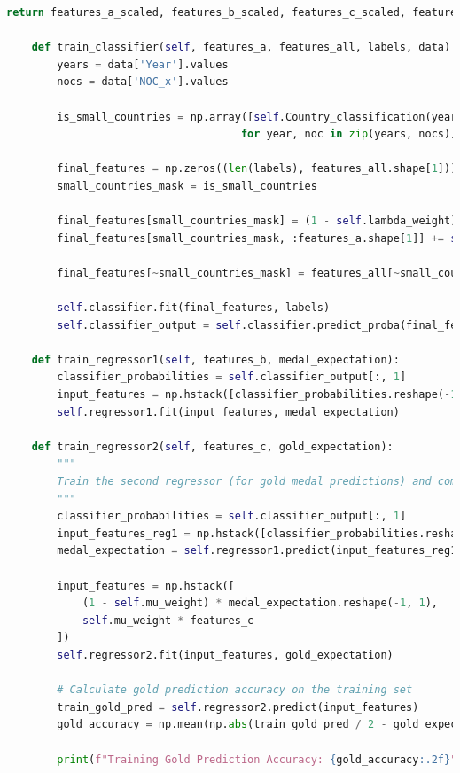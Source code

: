 \documentclass[12pt]{article}
\begin{document}
\begin{lstlisting}[language=Python, style=mystyle, caption=model.ipynb]
        return features_a_scaled, features_b_scaled, features_c_scaled, features_all_scaled, labels, medal_expectation, gold_expectation

    def train_classifier(self, features_a, features_all, labels, data):
        years = data['Year'].values
        nocs = data['NOC_x'].values

        is_small_countries = np.array([self.Country_classification(year, noc, data)
                                     for year, noc in zip(years, nocs)])

        final_features = np.zeros((len(labels), features_all.shape[1]))
        small_countries_mask = is_small_countries

        final_features[small_countries_mask] = (1 - self.lambda_weight) * features_all[small_countries_mask]
        final_features[small_countries_mask, :features_a.shape[1]] += self.lambda_weight * features_a[small_countries_mask]

        final_features[~small_countries_mask] = features_all[~small_countries_mask]

        self.classifier.fit(final_features, labels)
        self.classifier_output = self.classifier.predict_proba(final_features)

    def train_regressor1(self, features_b, medal_expectation):
        classifier_probabilities = self.classifier_output[:, 1]
        input_features = np.hstack([classifier_probabilities.reshape(-1, 1), features_b])
        self.regressor1.fit(input_features, medal_expectation)

    def train_regressor2(self, features_c, gold_expectation):
        """
        Train the second regressor (for gold medal predictions) and compute training accuracy.
        """
        classifier_probabilities = self.classifier_output[:, 1]
        input_features_reg1 = np.hstack([classifier_probabilities.reshape(-1, 1), features_c])
        medal_expectation = self.regressor1.predict(input_features_reg1)

        input_features = np.hstack([
            (1 - self.mu_weight) * medal_expectation.reshape(-1, 1),
            self.mu_weight * features_c
        ])
        self.regressor2.fit(input_features, gold_expectation)

        # Calculate gold prediction accuracy on the training set
        train_gold_pred = self.regressor2.predict(input_features)
        gold_accuracy = np.mean(np.abs(train_gold_pred / 2 - gold_expectation) < 2)

        print(f"Training Gold Prediction Accuracy: {gold_accuracy:.2f}")


\end{lstlisting}
\end{document}
